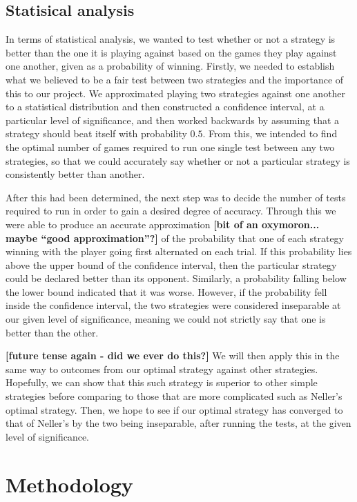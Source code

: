 \documentclass[a4paper,titlepage]{article}
\begin{document}
\subsection{Statisical analysis}
In terms of statistical analysis, we wanted to test whether or not a strategy is better than the one it is playing against based on the games they play against one another, given as a probability of winning. Firstly, we needed to establish what we believed to be a fair test between two strategies and the importance of this to our project. We approximated playing two strategies against one another to a statistical distribution and then constructed a confidence interval, at a particular level of significance, and then worked backwards by assuming that a strategy should beat itself with probability $0.5$. From this, we intended to find the optimal number of games required to run one single test between any two strategies, so that we could accurately say whether or not a particular strategy is consistently better than another.

After this had been determined, the next step was to decide the number of tests required to run in order to gain a desired degree of accuracy. Through this we were able to produce an accurate approximation \textbf{[bit of an oxymoron... maybe ``good approximation''?]} of the probability that one of each strategy winning with the player going first alternated on each trial. If this probability lies above the upper bound of the confidence interval, then the particular strategy could be declared better than its opponent. Similarly, a probability falling below the lower bound indicated that it was worse. However, if the probability fell inside the confidence interval, the two strategies were considered inseparable at our given level of significance, meaning we could not strictly say that one is better than the other.

\textbf{[future tense again - did we ever do this?]} We will then apply this in the same way to outcomes from our optimal strategy against other strategies. Hopefully, we can show that this such strategy is superior to other simple strategies before comparing to those that are more complicated such as Neller’s optimal strategy. Then, we hope to see if our optimal strategy has converged to that of Neller’s by the two being inseparable, after running the tests, at the given level of significance.

\section{Methodology}
\end{document}
